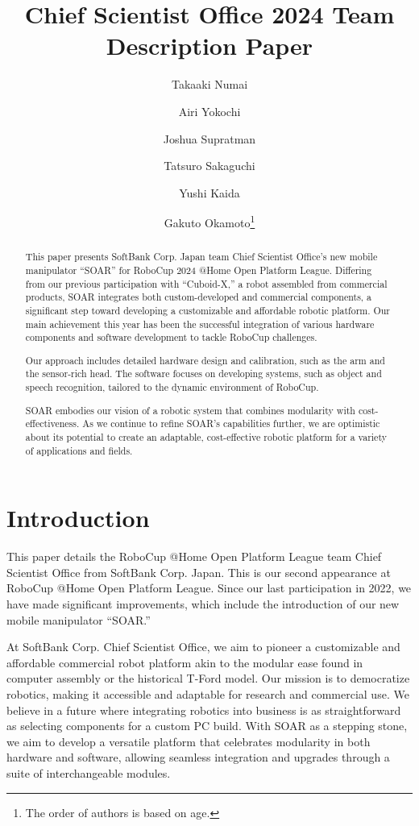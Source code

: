 \documentclass[runningheads,a4paper]{llncs}
\title{Chief Scientist Office 2024 Team Description Paper}
\author{Takaaki Numai \and Airi Yokochi \and Joshua Supratman \and Tatsuro Sakaguchi \and Yushi Kaida \and Gakuto Okamoto\thanks{The order of authors is based on age.}}
\institute{Affiliation name and address, \\
\texttt{http://devoted-web-site.url}}
\begin{document}
\maketitle

%
%

\begin{abstract}
	This paper presents SoftBank Corp. Japan team Chief Scientist Office’s new mobile manipulator “SOAR” for RoboCup 2024 @Home Open Platform League.
	Differing from our previous participation with “Cuboid-X,” a robot assembled from commercial products, SOAR integrates both custom-developed and commercial components, a significant step toward developing a customizable and affordable robotic platform.
	Our main achievement this year has been the successful integration of various hardware components and software development to tackle RoboCup challenges.

	Our approach includes detailed hardware design and calibration, such as the arm and the sensor-rich head.
	The software focuses on developing systems, such as object and speech recognition, tailored to the dynamic environment of RoboCup.

	SOAR embodies our vision of a robotic system that combines modularity with cost-effectiveness.
	As we continue to refine SOAR’s capabilities further, we are optimistic about its potential to create an adaptable, cost-effective robotic platform for a variety of applications and fields.

\end{abstract}



\section{Introduction}
This paper details the RoboCup @Home Open Platform League team Chief Scientist Office from SoftBank Corp. Japan.
This is our second appearance at RoboCup @Home Open Platform League.
Since our last participation in 2022, we have made significant improvements, which include the introduction of our new mobile manipulator “SOAR.”

At SoftBank Corp. Chief Scientist Office, we aim to pioneer a customizable and affordable commercial robot platform akin to the modular ease found in computer assembly or the historical T-Ford model.
Our mission is to democratize robotics, making it accessible and adaptable for research and commercial use.
We believe in a future where integrating robotics into business is as straightforward as selecting components for a custom PC build.
With SOAR as a stepping stone, we aim to develop a versatile platform that celebrates modularity in both hardware and software, allowing seamless integration and upgrades through a suite of interchangeable modules.
\end{document}
